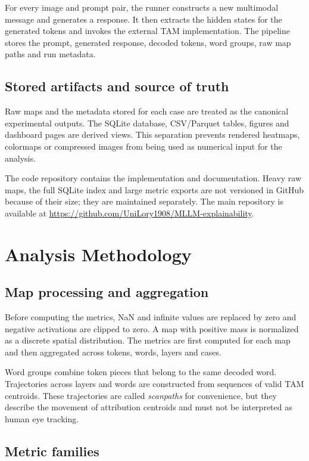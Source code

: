 \documentclass[11pt,a4paper]{article}
\begin{document}
For every image and prompt pair, the runner constructs a new multimodal message and generates a response. It then extracts the hidden states for the generated tokens and invokes the external TAM implementation. The pipeline stores the prompt, generated response, decoded tokens, word groups, raw map paths and run metadata.

\subsection{Stored artifacts and source of truth}

Raw maps and the metadata stored for each case are treated as the canonical experimental outputs. The SQLite database, CSV/Parquet tables, figures and dashboard pages are derived views. This separation prevents rendered heatmaps, colormaps or compressed images from being used as numerical input for the analysis.

The code repository contains the implementation and documentation. Heavy raw maps, the full SQLite index and large metric exports are not versioned in GitHub because of their size; they are maintained separately. The main repository is available at \url{https://github.com/UniLory1908/MLLM-explainability}.

\section{Analysis Methodology}

\subsection{Map processing and aggregation}

Before computing the metrics, NaN and infinite values are replaced by zero and negative activations are clipped to zero. A map with positive mass is normalized as a discrete spatial distribution. The metrics are first computed for each map and then aggregated across tokens, words, layers and cases.

Word groups combine token pieces that belong to the same decoded word. Trajectories across layers and words are constructed from sequences of valid TAM centroids. These trajectories are called \emph{scanpaths} for convenience, but they describe the movement of attribution centroids and must not be interpreted as human eye tracking.

\subsection{Metric families}
\end{document}
